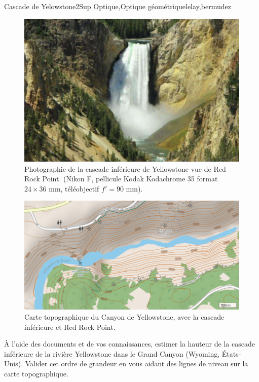 \begin{exercise}{Cascade de Yelowstone}{2}{Sup}
{Optique,Optique géométrique}{lelay,bermudez}

\begin{figure}[H]
    \centering
    \includegraphics[width=1.\linewidth]{optique/optiquegeometrique/cascade1.png}
    \caption{Photographie de la cascade inférieure de Yellowstone vue de Red Rock Point. \newline (Nikon F, pellicule Kodak Kodachrome 35 format $24\times 36$ mm, téléobjectif $f'= 90$ mm).}
\end{figure}

\begin{figure}[H]
    \centering
    \includegraphics[width=1.\linewidth]{optique/optiquegeometrique/cascade2.png}
    \caption{Carte topographique du Canyon de Yellowstone, avec la cascade inférieure et Red Rock Point.}
\end{figure}

 À l’aide des documents et de vos connaissances, estimer la hauteur de la cascade inférieure de la rivière Yellowstone dans le Grand Canyon (Wyoming, États-Unis). \newline
Valider cet ordre de grandeur en vous aidant des lignes de niveau sur la carte topographique.

\end{exercise}

